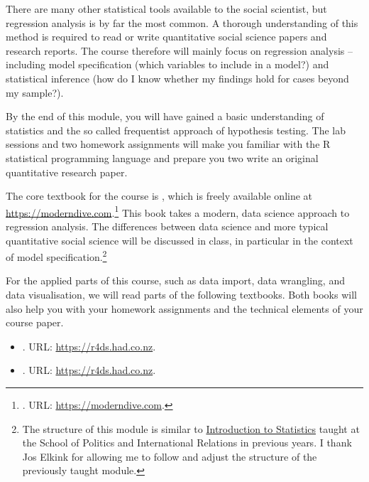 \documentclass[abstract=on,parskip=full,headings=standardclasses,fontsize=11pt,paper=a4]{scrartcl}
\begin{document}
There are many other statistical tools available to the social scientist, but regression analysis is by far the most common. A thorough understanding of this method is required to read or write quantitative social science papers and research reports. The course therefore will mainly focus on regression analysis -- including model specification (which variables to include in a model?) and statistical inference (how do I know whether my findings hold for cases beyond my sample?).

By the end of this module, you will have gained a basic understanding of statistics and the so called frequentist approach of hypothesis testing. The lab sessions and two homework assignments will make you familiar with the \textsf{R} statistical programming language and prepare you two write an original quantitative research paper. 



The core textbook for the course is \textcite{ismay20}, which is freely available online at \url{https://moderndive.com}.\footnote{. URL: \url{https://moderndive.com}.} This book takes a modern, data science approach to regression analysis. The differences between data science and more typical quantitative social science will be discussed in class, in particular in the context of model specification.\footnote{The structure of this module is similar to \href{http://www.joselkink.net/STATS-Autumn-2019.php}{Introduction to Statistics} taught at the School of Politics and International Relations in previous years. I thank Jos Elkink for allowing me to follow and adjust the structure of the previously taught module.}

For the applied parts of this course, such as data import, data wrangling, and data visualisation, we will read parts of the following textbooks. Both books will also help you with your homework assignments and the technical elements of your course paper. 

\begin{itemize}
\item {}. URL: \url{https://r4ds.had.co.nz}.
\item {}. URL: \url{https://r4ds.had.co.nz}.
\end{itemize}
\end{document}

